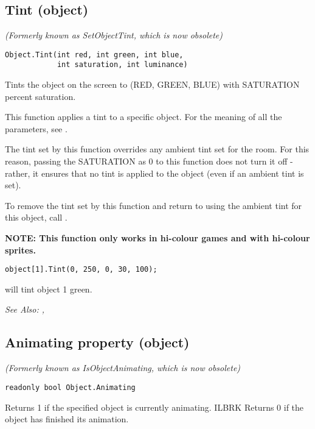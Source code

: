 \subsection{Tint (object)}\label{Object.Tint}%

\it{(Formerly known as SetObjectTint, which is now obsolete)}

\begin{verbatim}
Object.Tint(int red, int green, int blue,
            int saturation, int luminance)
\end{verbatim}

Tints the object on the screen to (RED, GREEN, BLUE) with SATURATION percent
saturation.

This function applies a tint to a specific object. For the meaning of all the parameters,
see .

The tint set by this function overrides any ambient tint set for the room. For this
reason, passing the SATURATION as 0 to this function does not turn it off - rather, it
ensures that no tint is applied to the object (even if an ambient tint is set).

To remove the tint set by this function and return to using the ambient tint for this
object, call .

\bf{NOTE:} This function only works in hi-colour games and with hi-colour sprites.

\begin{verbatim}
object[1].Tint(0, 250, 0, 30, 100);
\end{verbatim}
will tint object 1 green.

\it{See Also:} ,



\subsection{Animating property (object)}\label{Object.Animating}%

\it{(Formerly known as IsObjectAnimating, which is now obsolete)}

\begin{verbatim}
readonly bool Object.Animating
\end{verbatim}
Returns 1 if the specified object is currently animating. ILBRK
Returns 0 if the object has finished its animation.

